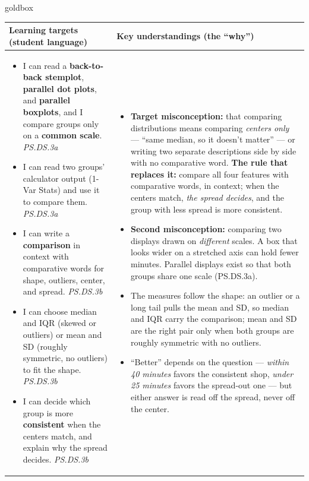 \documentclass[10pt]{article}
\begin{document}
\renewcommand{\arraystretch}{1.4}
\boxguard
\begin{skillbox}{goldbox}
\begin{tabularx}{\linewidth}{@{}X|X@{}}
\textbf{Learning targets (student language)} & \textbf{Key understandings (the ``why'')} \\[2pt]
\hline
\vspace{-6pt}
\begin{itemize}[leftmargin=1.1em, nosep, after=\vspace{2pt}]
  \item I can read a \textbf{back-to-back stemplot}, \textbf{parallel dot plots}, and
        \textbf{parallel boxplots}, and I compare groups only on a \textbf{common scale}.
        \hfill \textit{PS.DS.3a}
  \item I can read two groups' calculator output (1-Var Stats) and use it to compare them.
        \hfill \textit{PS.DS.3a}
  \item I can write a \textbf{comparison} in context with comparative words for shape,
        outliers, center, and spread. \hfill \textit{PS.DS.3b}
  \item I can choose median and IQR (skewed or outliers) or mean and SD (roughly symmetric,
        no outliers) to fit the shape. \hfill \textit{PS.DS.3b}
  \item I can decide which group is more \textbf{consistent} when the centers match, and
        explain why the spread decides. \hfill \textit{PS.DS.3b}
\end{itemize}
&
\vspace{-6pt}
\begin{itemize}[leftmargin=1.1em, nosep, after=\vspace{2pt}]
  \item \textbf{Target misconception:} that comparing distributions means comparing
        \emph{centers only} --- ``same median, so it doesn't matter'' --- or writing two
        separate descriptions side by side with no comparative word. \textbf{The rule that
        replaces it:} compare all four features with comparative words, in context; when the
        centers match, \emph{the spread decides}, and the group with less spread is more
        consistent.
  \item \textbf{Second misconception:} comparing two displays drawn on \emph{different}
        scales. A box that looks wider on a stretched axis can hold fewer minutes. Parallel
        displays exist so that both groups share one scale (PS.DS.3a).
  \item The measures follow the shape: an outlier or a long tail pulls the mean and SD, so
        median and IQR carry the comparison; mean and SD are the right pair only when both
        groups are roughly symmetric with no outliers.
  \item ``Better'' depends on the question --- \emph{within 40 minutes} favors the consistent
        shop, \emph{under 25 minutes} favors the spread-out one --- but either answer is read
        off the spread, never off the center.
\end{itemize}
\end{tabularx}
\end{skillbox}
\end{document}
